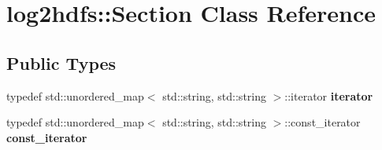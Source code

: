 \hypertarget{classlog2hdfs_1_1Section}{}\section{log2hdfs\+:\+:Section Class Reference}
\label{classlog2hdfs_1_1Section}
\subsection*{Public Types}
\begin{DoxyCompactItemize}
\item 
typedef std\+::unordered\+\_\+map$<$ std\+::string, std\+::string $>$\+::iterator {\bfseries iterator}\hypertarget{classlog2hdfs_1_1Section_a395082589cdd133dfed9f7880ba86e3c}{}\label{classlog2hdfs_1_1Section_a395082589cdd133dfed9f7880ba86e3c}

\item 
typedef std\+::unordered\+\_\+map$<$ std\+::string, std\+::string $>$\+::const\+\_\+iterator {\bfseries const\+\_\+iterator}\hypertarget{classlog2hdfs_1_1Section_af425058ae6ee4e199229dcdeaae1bda7}{}\label{classlog2hdfs_1_1Section_af425058ae6ee4e199229dcdeaae1bda7}

\end{DoxyCompactItemize}
